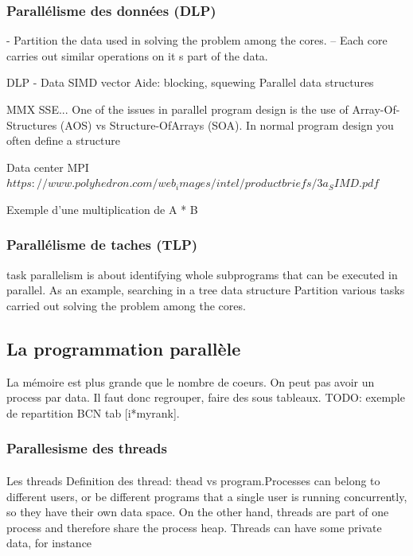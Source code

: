 \subsubsection{Parallélisme des données (DLP)}
- Partition the data used in solving the problem among the cores.
–  Each core carries out similar operations on it s part of the data.

DLP - Data
	SIMD vector
	Aide: blocking, squewing
	Parallel data structures
	
MMX SSE...
One of the issues in parallel program design is the use of Array-Of-Structures (AOS) vs Structure-OfArrays
(SOA). In normal program design you often define a structure
	
Data center
MPI
$https://www.polyhedron.com/web_images/intel/productbriefs/3a_SIMD.pdf$

Exemple d'une multiplication de A * B


\subsubsection{Parallélisme de taches (TLP)}
task parallelism is about identifying whole
subprograms that can be executed in parallel. As an example, searching in a tree data structure
Partition various tasks carried out solving the problem among the
cores.


\subsection{La programmation parallèle}
La mémoire est plus grande que le nombre de coeurs. On peut pas avoir un process par data. Il faut donc regrouper, faire des sous tableaux. TODO: exemple de repartition BCN tab [i*myrank].

 


\subsubsection{Parallesisme des threads}

\paragraph{}{Les threads}
Definition des thread: thead vs program.Processes can belong to different users, or be different programs that a single user is running concurrently,
so they have their own data space. On the other hand, threads are part of one process and therefore share
the process heap. Threads can have some private data, for instance

